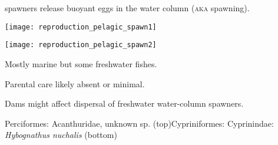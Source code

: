 \label{key}\documentclass[t]{beamer}
\begin{document}
\begin{frame}[t]{ spawners release buoyant eggs in the water column (\textsc{aka}  spawning).}

\vspace*{-\baselineskip}

\begin{multicols}{2}
\texttt{[image: reproduction\_pelagic\_spawn1]}
\vspace*{0.5ex}

\texttt{[image: reproduction\_pelagic\_spawn2]}

\columnbreak

Mostly marine but some freshwater fishes.
\vspace*{\baselineskip}

Parental care likely absent or minimal.
\vspace*{\baselineskip}

Dams might affect dispersal of freshwater water-column spawners.
\end{multicols}

\vfilll

\tiny Perciformes: Acanthuridae, unknown sp. (top)\hfill Cypriniformes: Cyprinindae: \textit{Hybognathus nuchalis} (bottom)

\end{frame}
\end{document}
